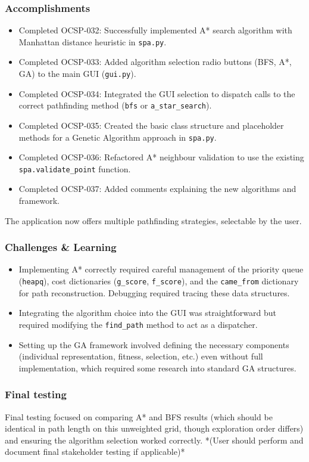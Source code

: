 \subsubsection{Accomplishments}
\begin{itemize}
	\item Completed OCSP-032: Successfully implemented A* search algorithm with Manhattan distance heuristic in \verb|spa.py|.
	\item Completed OCSP-033: Added algorithm selection radio buttons (BFS, A*, GA) to the main GUI (\verb|gui.py|).
	\item Completed OCSP-034: Integrated the GUI selection to dispatch calls to the correct pathfinding method (\verb|bfs| or \verb|a_star_search|).
	\item Completed OCSP-035: Created the basic class structure and placeholder methods for a Genetic Algorithm approach in \verb|spa.py|.
	\item Completed OCSP-036: Refactored A* neighbour validation to use the existing \verb|spa.validate_point| function.
	\item Completed OCSP-037: Added comments explaining the new algorithms and framework.
\end{itemize}
The application now offers multiple pathfinding strategies, selectable by the user.

\subsubsection{Challenges \& Learning}
\begin{itemize}
	\item Implementing A* correctly required careful management of the priority queue (\verb|heapq|), cost dictionaries (\verb|g_score|, \verb|f_score|), and the \verb|came_from| dictionary for path reconstruction. Debugging required tracing these data structures.
	\item Integrating the algorithm choice into the GUI was straightforward but required modifying the \verb|find_path| method to act as a dispatcher.
	\item Setting up the GA framework involved defining the necessary components (individual representation, fitness, selection, etc.) even without full implementation, which required some research into standard GA structures.
\end{itemize}

\subsubsection{Final testing}
Final testing focused on comparing A* and BFS results (which should be identical in path length on this unweighted grid, though exploration order differs) and ensuring the algorithm selection worked correctly.
*(User should perform and document final stakeholder testing if applicable)*

